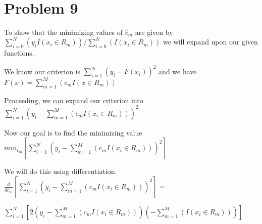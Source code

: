 \documentclass[11pt]{article}
\begin{document}
\begin{center}

\ \\
\end{center}


\section*{Problem 9}

\vspace{5 mm}
\noindent
To show that the minimizing values of $\hat{c}_{m}$ are given by $\sum\limits_{i=0}^N (y_{i} I(x_{i} \in R_{m})) / \sum\limits_{i=0}^N (I(x_{i} \in R_{m}))$ we will expand upon our given functions.

\vspace{3 mm}
\noindent
We know our criterion is $\sum\limits_{i=1}^N (y_{i} - F(x_{i}))^2$ and we have $F(x) = \sum\limits_{m=1}^M (c_{m}I(x \in R_{m}))$

\vspace{3 mm}
\noindent
Proceeding, we can expand our criterion into $\sum\limits_{i=1}^N (y_{i} - \sum\limits_{m=1}^M (c_{m}I(x_{i} \in R_{m})))^2$

\vspace{3 mm}
\noindent
Now our goal is to find the minimizing value $min_{c_{m}}[\sum\limits_{i=1}^N (y_{i} - \sum\limits_{m=1}^M (c_{m}I(x_{i} \in R_{m})))^2]$ 

\vspace{3 mm}
\noindent
We will do this using differentiation.  $\frac{d}{dc_{m}}[\sum\limits_{i=1}^N (y_{i} - \sum\limits_{m=1}^M (c_{m}I(x_{i} \in R_{m})))^2] = $

\vspace{3 mm}
\noindent
$\sum\limits_{i=1}^N [2(y_{i} - \sum\limits_{m=1}^M (c_{m}I(x_{i} \in R_{m})))(-\sum\limits_{m=1}^M (I(x_{i} \in R_{m})))]$
\end{document}
